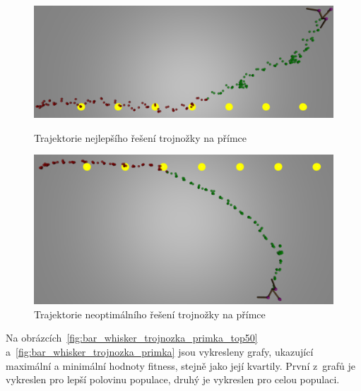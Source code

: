 \begin{figure}[h]
    \begin{minipage}[c]{0.48\linewidth}
        \includegraphics[width=\linewidth]{obrazky/trojnozka_primka_zhora_nejlepsi_reseni_trajektorie.png}
        \caption{Trajektorie nejlepšího řešení trojnožky na přímce}
        \label{fig:trojnozka_primka_zhora_nejlepsi_reseni_trajektorie}
    \end{minipage}
    \hfill
    \begin{minipage}[c]{0.48\linewidth}
        \includegraphics[width=\linewidth]{obrazky/trojnozka_primka_zhora_neoptimalni_reseni_trajektorie.png}
        \caption{Trajektorie neoptimálního řešení trojnožky na přímce}
        \label{fig:trojnozka_primka_zhora_neoptimalni_reseni_trajektorie}
    \end{minipage}
\end{figure}

Na obrázcích~\ref{fig:bar_whisker_trojnozka_primka_top50} a~\ref{fig:bar_whisker_trojnozka_primka} jsou vykresleny grafy, ukazující maximální a minimální hodnoty fitness, stejně jako její kvartily.
První z~grafů je vykreslen pro lepší polovinu populace, druhý je vykreslen pro celou populaci.

